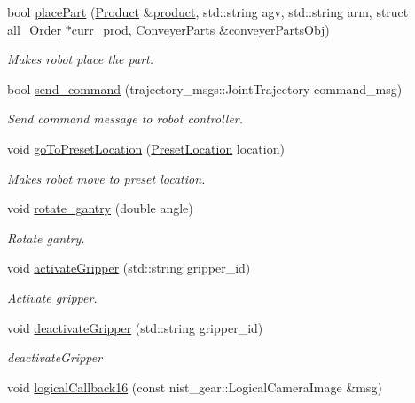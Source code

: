 \begin{DoxyCompactItemize}
bool \hyperlink{classGantryControl_a68b77a45d3daee67f600571a52ed9ac2}{place\+Part} (\hyperlink{structProduct}{Product} \&\hyperlink{utils_8h_a48a7207852c0455cce7e65703b12ec7e}{product}, std\+::string agv, std\+::string arm, struct \hyperlink{structall__Order}{all\+\_\+\+Order} $\ast$curr\+\_\+prod, \hyperlink{classConveyerParts}{Conveyer\+Parts} \&conveyer\+Parts\+Obj)
\begin{DoxyCompactList}\small\item\em Makes robot place the part. \end{DoxyCompactList}\item 
bool \hyperlink{classGantryControl_ab271ce06b0d336eddb26e1ba5a2ce594}{send\+\_\+command} (trajectory\+\_\+msgs\+::\+Joint\+Trajectory command\+\_\+msg)
\begin{DoxyCompactList}\small\item\em Send command message to robot controller. \end{DoxyCompactList}\item 
void \hyperlink{classGantryControl_a6986d4f622840037e003c6db840d78ed}{go\+To\+Preset\+Location} (\hyperlink{structPresetLocation}{Preset\+Location} location)
\begin{DoxyCompactList}\small\item\em Makes robot move to preset location. \end{DoxyCompactList}\item 
void \hyperlink{classGantryControl_ad7a304b37a95f29634631d4183276be3}{rotate\+\_\+gantry} (double angle)
\begin{DoxyCompactList}\small\item\em Rotate gantry. \end{DoxyCompactList}\item 
void \hyperlink{classGantryControl_aaccd9c43b5564c198288ba51cbcecabe}{activate\+Gripper} (std\+::string gripper\+\_\+id)
\begin{DoxyCompactList}\small\item\em Activate gripper. \end{DoxyCompactList}\item 
void \hyperlink{classGantryControl_a1485577d4e29baf708a4c5c028a47798}{deactivate\+Gripper} (std\+::string gripper\+\_\+id)
\begin{DoxyCompactList}\small\item\em deactivate\+Gripper \end{DoxyCompactList}\item 
void \hyperlink{classGantryControl_a9206feae49953cf691e0dec2331cc3ae}{logical\+Callback16} (const nist\+\_\+gear\+::\+Logical\+Camera\+Image \&msg)

\end{DoxyCompactItemize}
